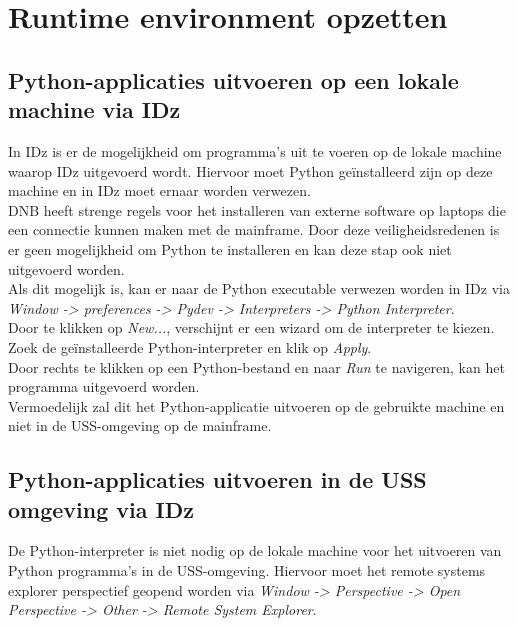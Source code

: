 
\chapter{Runtime environment opzetten}
\label{ch:runtime-environment}
\section{Python-applicaties uitvoeren op een lokale machine via IDz}
In IDz is er de mogelijkheid om programma's uit te voeren op de lokale machine waarop IDz uitgevoerd wordt. Hiervoor moet Python geïnstalleerd zijn op deze machine en in IDz moet ernaar worden verwezen. \\

DNB heeft strenge regels voor het installeren van externe software op laptops die een connectie kunnen maken met de mainframe. Door deze veiligheidsredenen is er geen mogelijkheid om Python te installeren en kan deze stap ook niet uitgevoerd worden. \\

Als dit mogelijk is, kan er naar de Python executable verwezen worden in IDz via \textit{Window -> preferences -> Pydev -> Interpreters -> Python Interpreter}. \\
Door te klikken op \textit{New...}, verschijnt er een wizard om de interpreter te kiezen. Zoek de geïnstalleerde Python-interpreter en klik op \textit{Apply}. \\

Door rechts te klikken op een Python-bestand en naar \textit{Run} te navigeren, kan het programma uitgevoerd worden. \\
Vermoedelijk zal dit het Python-applicatie uitvoeren op de gebruikte machine en niet in de USS-omgeving op de mainframe. 


\section{Python-applicaties uitvoeren in de USS omgeving via IDz}
De Python-interpreter is niet nodig op de lokale machine voor het uitvoeren van Python programma's in de USS-omgeving. Hiervoor moet het remote systems explorer perspectief geopend worden via \textit{Window -> Perspective -> Open Perspective -> Other -> Remote System Explorer}. \\

